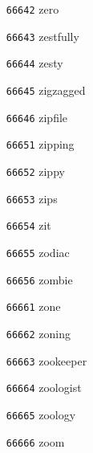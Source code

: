 \documentclass[twoside,11pt]{article}
\begin{document}
\begin{multicols}{5}
\begin{enumerate}
\item[\texttt{66642}] zero
\item[\texttt{66643}] zestfully
\item[\texttt{66644}] zesty
\item[\texttt{66645}] zigzagged
\item[\texttt{66646}] zipfile
\item[\texttt{66651}] zipping
\item[\texttt{66652}] zippy
\item[\texttt{66653}] zips
\item[\texttt{66654}] zit
\item[\texttt{66655}] zodiac
\item[\texttt{66656}] zombie
\item[\texttt{66661}] zone
\item[\texttt{66662}] zoning
\item[\texttt{66663}] zookeeper
\item[\texttt{66664}] zoologist
\item[\texttt{66665}] zoology
\item[\texttt{66666}] zoom
\end{enumerate}
\end{multicols}
\end{document}
